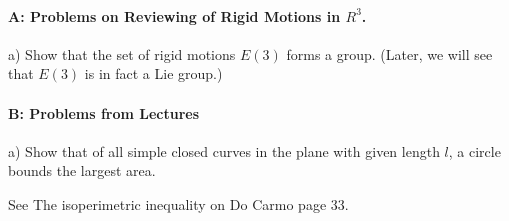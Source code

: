\documentclass[12pt,letterpaper,boxed]{hmcpset}
\begin{document}
\paragraph{A: Problems on Reviewing of Rigid Motions in $R^3$.}
\begin{itemize}

{\item a) Show that the set of rigid motions $E(3)$ forms a group. 
(Later, we will see that  $E(3)$ is in fact a Lie group.)} 
 
\end{itemize}
\begin{solution}
  
\end{solution}
\medskip
\paragraph{B: Problems from Lectures}

\begin{itemize}
{\item a) Show that of all simple closed curves in the plane with 
given length $l$, a circle bounds the largest area.}
\begin{solution}
See The isoperimetric inequality on Do Carmo page 33.
\end{solution}
\end{itemize}
\end{document}
